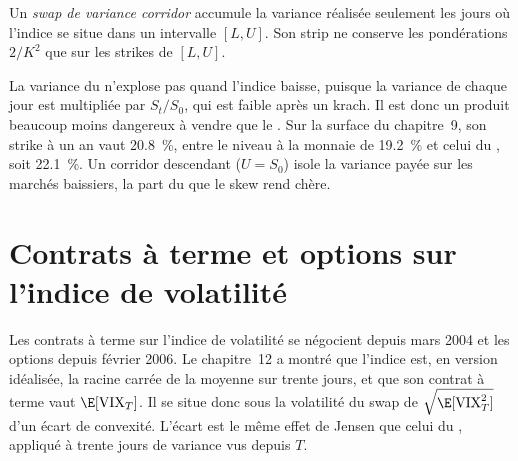 \begin{definition}\label{def:dv:variance-swaps-and-volatility-derivatives:corridor}
Un \emph{swap de variance corridor} accumule la variance réalisée seulement les jours où
l'indice se situe dans un intervalle $[L,U]$. Son strip ne conserve les pondérations $2/K^2$ que sur les strikes de $[L,U]$.
\end{definition}

La variance du  n'explose pas quand l'indice baisse, puisque la variance de chaque jour est multipliée par
$S_t/S_0$, qui est faible après un krach. Il est donc un produit beaucoup moins dangereux à vendre que le . Sur
la surface du chapitre~9, son strike à un an vaut 20.8~\%, entre le niveau à la monnaie de 19.2~\% et celui du ,
soit 22.1~\%. Un corridor descendant ($U=S_0$) isole la variance payée sur les marchés baissiers, la part du 
que le skew rend chère.

\section{Contrats à terme et options sur l'indice de volatilité}

Les contrats à terme sur l'indice de volatilité se négocient depuis mars 2004 et les options depuis février 2006. Le chapitre~12 a montré
que l'indice est, en version idéalisée, la racine carrée de la  moyenne sur trente jours, et que son
contrat à terme vaut $\E[\mathrm{VIX}_T]$. Il se situe donc sous la volatilité du swap de 
$\sqrt{\E[\mathrm{VIX}_T^2]}$ d'un écart de convexité. L'écart est le même effet de Jensen que celui du ,
appliqué à trente jours de variance vus depuis $T$.

